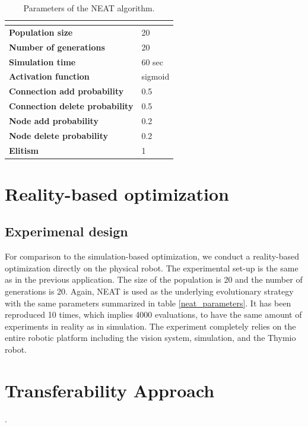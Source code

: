 \begin{table}[H]
\centering
\begin{tabular}{ll}
\hline
\textbf{}                      & \textbf{} \\ \hline
\textbf{Population size}       & 20        \\
\textbf{Number of generations} & 20        \\
\textbf{Simulation time}       & 60 sec    \\
\textbf{Activation function}             & sigmoid       \\
\textbf{Connection add probability}              & 0.5       \\
\textbf{Connection delete probability}              & 0.5       \\
\textbf{Node add probability}              & 0.2       \\
\textbf{Node delete probability}              & 0.2       \\
\textbf{Elitism}  & 1      
\end{tabular}
\caption{Parameters of the NEAT algorithm.}
\label{tab:neat_parameters}
\end{table}

\section{Reality-based optimization}

\subsection{Experimenal design}

For comparison to the simulation-based optimization, we conduct a reality-based optimization directly on the physical robot. The experimental set-up is the same as in the previous application. The size of the population is 20 and the number of generations is 20. Again, NEAT is used as the underlying evolutionary strategy with the same parameters summarized in table \ref{neat_parameters}. It has been reproduced 10 times, which implies 4000 evaluations, to have the same amount of experiments in reality as in simulation. The experiment completely relies on the entire robotic platform including the vision system, simulation, and the Thymio robot.

\section{Transferability Approach}.

